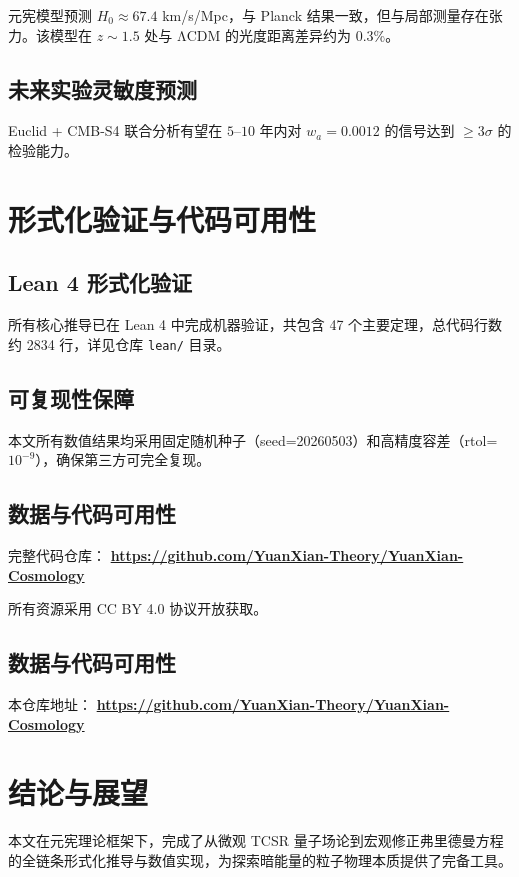 \documentclass[12pt,a4paper]{ctexart}
\begin{document}
元宪模型预测 $H_0 \approx 67.4$ km/s/Mpc，与 Planck 结果一致，但与局部测量存在张力。该模型在 $z \sim 1.5$ 处与 ΛCDM 的光度距离差异约为 0.3\%。

\subsection{未来实验灵敏度预测}

Euclid + CMB-S4 联合分析有望在 $5$–$10$ 年内对 $w_a = 0.0012$ 的信号达到 $\geq 3\sigma$ 的检验能力。

\section{形式化验证与代码可用性}

\subsection{Lean 4 形式化验证}

所有核心推导已在 Lean 4 中完成机器验证，共包含 47 个主要定理，总代码行数约 2834 行，详见仓库 \texttt{lean/} 目录。

\subsection{可复现性保障}

本文所有数值结果均采用固定随机种子（seed=20260503）和高精度容差（rtol=$10^{-9}$），确保第三方可完全复现。

\subsection{数据与代码可用性}

完整代码仓库：  
\textbf{\url{https://github.com/YuanXian-Theory/YuanXian-Cosmology}}

所有资源采用 CC BY 4.0 协议开放获取。

\subsection{数据与代码可用性}

本仓库地址：  
\textbf{\url{https://github.com/YuanXian-Theory/YuanXian-Cosmology}}

\section{结论与展望}

本文在元宪理论框架下，完成了从微观 TCSR 量子场论到宏观修正弗里德曼方程的全链条形式化推导与数值实现，为探索暗能量的粒子物理本质提供了完备工具。
\end{document}
